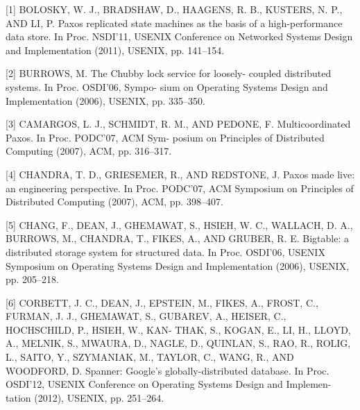 \documentclass[journal]{IEEEtran}
\begin{document}


% 






[1] BOLOSKY, W. J., BRADSHAW, D., HAAGENS, R. B., KUSTERS, N. P., AND LI, P. Paxos replicated state machines as the basis of a high-performance data store. In Proc. NSDI’11, USENIX Conference on Networked Systems Design and Implementation (2011), USENIX, pp. 141–154.

[2] BURROWS, M. The Chubby lock service for loosely- coupled distributed systems. In Proc. OSDI’06, Sympo- sium on Operating Systems Design and Implementation (2006), USENIX, pp. 335–350.

[3] CAMARGOS, L. J., SCHMIDT, R. M., AND PEDONE, F. Multicoordinated Paxos. In Proc. PODC’07, ACM Sym- posium on Principles of Distributed Computing (2007), ACM, pp. 316–317.

[4] CHANDRA, T. D., GRIESEMER, R., AND REDSTONE, J. Paxos made live: an engineering perspective. In Proc. PODC’07, ACM Symposium on Principles of Distributed Computing (2007), ACM, pp. 398–407.

[5] CHANG, F., DEAN, J., GHEMAWAT, S., HSIEH, W. C., WALLACH, D. A., BURROWS, M., CHANDRA, T., FIKES, A., AND GRUBER, R. E. Bigtable: a distributed storage system for structured data. In Proc. OSDI’06, USENIX Symposium on Operating Systems Design and Implementation (2006), USENIX, pp. 205–218.

[6] CORBETT, J. C., DEAN, J., EPSTEIN, M., FIKES, A., FROST, C., FURMAN, J. J., GHEMAWAT, S., GUBAREV, A., HEISER, C., HOCHSCHILD, P., HSIEH, W., KAN- THAK, S., KOGAN, E., LI, H., LLOYD, A., MELNIK, S., MWAURA, D., NAGLE, D., QUINLAN, S., RAO, R., ROLIG, L., SAITO, Y., SZYMANIAK, M., TAYLOR, C., WANG, R., AND WOODFORD, D. Spanner: Google’s globally-distributed database. In Proc. OSDI’12, USENIX Conference on Operating Systems Design and Implemen- tation (2012), USENIX, pp. 251–264.
\end{document}
